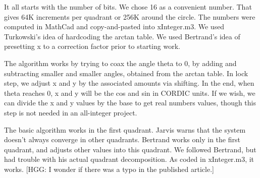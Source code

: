 It all starts with the number of bits.  We chose 16 as a convenient
number.  That gives 64K increments per quadrant or 256K around the 
circle.  The numbers were computed in MathCad and copy-and-pasted
into xInteger.m3. We used Turkowski's idea of hardcoding the
arctan table.  We used Bertrand's idea of presetting x to a correction
factor prior to starting work.

The algorithm works by trying to coax the angle theta to 0, by
adding and subtracting smaller and smaller angles, obtained from the
arctan table. In lock step, we adjust x and y by the associated amounts
via shifting.  In the end, when theta reaches 0, x and y will be the 
cos and sin in CORDIC units.  If we wish, we can divide the x and y values
by the base to get real numbers values, though this step is not
needed in an all-integer project. 

The basic algorithm works in the first quadrant.  Jarvis warns that 
the system doesn't always converge in other quadrants.  Bertrand 
works only in the first quadrant, and adjusts other values into
this quadrant.  We followed Bertrand, but had trouble with his actual
quadrant decomposition.  As coded in xInteger.m3, it works.  [HGG:
I wonder if there was a typo in the published article.]
